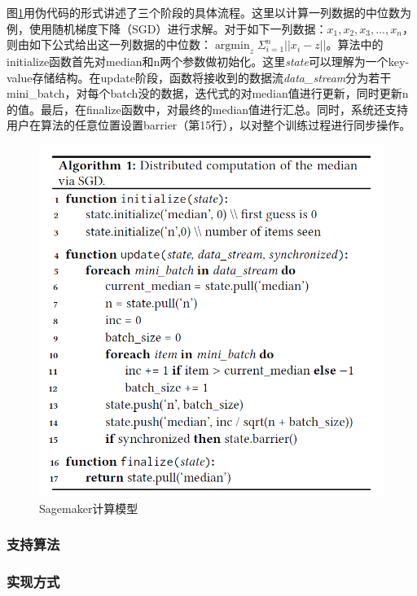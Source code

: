 图\ref{sage_cmp_mdl}用伪代码的形式讲述了三个阶段的具体流程。这里以计算一列数据的中位数为例，使用随机梯度下降（SGD）进行求解。对于如下一列数据：$x_1, x_2, x_3, ..., x_n$，则由如下公式给出这一列数据的中位数：$\operatorname{argmin}_z\Sigma_{i=1}^n||x_i-z||$。算法中的initialize函数首先对median和n两个参数做初始化。这里\textit{state}可以理解为一个key-value存储结构。在update阶段，函数将接收到的数据流\textit{data\_stream}分为若干mini\_batch，对每个batch没的数据，迭代式的对median值进行更新，同时更新n的值。最后，在finalize函数中，对最终的median值进行汇总。同时，系统还支持用户在算法的任意位置设置barrier（第15行），以对整个训练过程进行同步操作。

\begin{figure}
    \centerline{\includegraphics[width=\textwidth]{figures/compute-model.png}}
    \caption{Sagemaker计算模型}
    \label{sage_cmp_mdl}
\end{figure}

\subsubsection{支持算法}
\subsubsection{实现方式}

